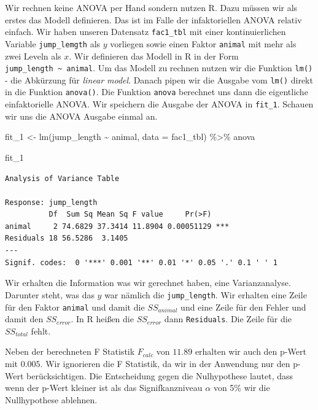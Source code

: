 \documentclass[
  letterpaper,
]{scrbook}
\newenvironment{Shaded}{\begin{snugshade}}{\end{snugshade}}
\newcommand{\AttributeTok}[1]{\textcolor[rgb]{0.40,0.45,0.13}{#1}}
\newcommand{\FunctionTok}[1]{\textcolor[rgb]{0.28,0.35,0.67}{#1}}
\newcommand{\NormalTok}[1]{\textcolor[rgb]{0.00,0.23,0.31}{#1}}
\newcommand{\OtherTok}[1]{\textcolor[rgb]{0.00,0.23,0.31}{#1}}
\newcommand{\SpecialCharTok}[1]{\textcolor[rgb]{0.37,0.37,0.37}{#1}}
\begin{document}
Wir rechnen keine ANOVA per Hand sondern nutzen R. Dazu müssen wir als
erstes das Modell definieren. Das ist im Falle der infaktoriellen ANOVA
relativ einfach. Wir haben unseren Datensatz \texttt{fac1\_tbl} mit
einer kontinuierlichen Variable \texttt{jump\_lemgth} als \(y\)
vorliegen sowie einen Faktor \texttt{animal} mit mehr als zwei Leveln
als \(x\). Wir definieren das Modell in R in der Form
\texttt{jump\_length\ \textasciitilde{}\ animal}. Um das Modell zu
rechnen nutzen wir die Funktion \texttt{lm()} - die Abkürzung für
\emph{linear model}. Danach pipen wir die Ausgabe vom \texttt{lm()}
direkt in die Funktion \texttt{anova()}. Die Funktion \texttt{anova}
berechnet uns dann die eigentliche einfaktorielle ANOVA. Wir speichern
die Ausgabe der ANOVA in \texttt{fit\_1}. Schauen wir uns die ANOVA
Ausgabe einmal an.

\begin{Shaded}
\begin{Highlighting}[]
\NormalTok{fit\_1 }\OtherTok{\textless{}{-}}  \FunctionTok{lm}\NormalTok{(jump\_length }\SpecialCharTok{\textasciitilde{}}\NormalTok{ animal, }\AttributeTok{data =}\NormalTok{ fac1\_tbl) }\SpecialCharTok{\%\textgreater{}\%} 
\NormalTok{  anova}

\NormalTok{fit\_1}
\end{Highlighting}
\end{Shaded}

\begin{verbatim}
Analysis of Variance Table

Response: jump_length
          Df  Sum Sq Mean Sq F value     Pr(>F)    
animal     2 74.6829 37.3414 11.8904 0.00051129 ***
Residuals 18 56.5286  3.1405                       
---
Signif. codes:  0 '***' 0.001 '**' 0.01 '*' 0.05 '.' 0.1 ' ' 1
\end{verbatim}

Wir erhalten die Information was wir gerechnet haben, eine
Varianzanalyse. Darunter steht, was das \(y\) war nämlich die
\texttt{jump\_length}. Wir erhalten eine Zeile für den Faktor
\texttt{animal} und damit die \(SS_{animal}\) und eine Zeile für den
Fehler und damit den \(SS_{error}\). In R heißen die \(SS_{error}\) dann
\texttt{Residuals}. Die Zeile für die \(SS_{total}\) fehlt.

Neben der berechneten F Statistik \(F_{calc}\) von \(11.89\) erhalten
wir auch den p-Wert mit \(0.005\). Wir ignorieren die F Statistik, da
wir in der Anwendung nur den p-Wert berücksichtigen. Die Entscheidung
gegen die Nulhypothese lautet, dass wenn der p-Wert kleiner ist als das
Signifkanzniveau \(\alpha\) von 5\% wir die Nullhypothese ablehnen.
\end{document}
